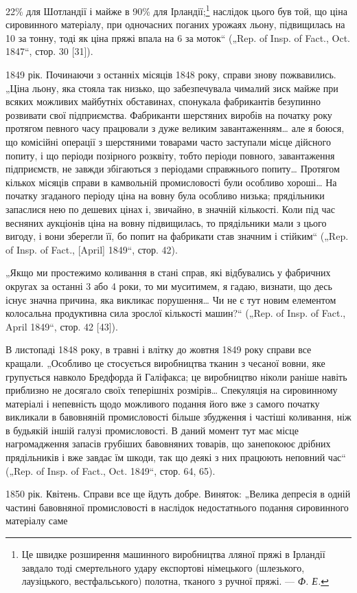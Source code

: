 \parcont{}  %
22\% для Шотландії і майже в 90\% для Ірландії;\footnote{
Це швидке розширення машинного виробництва лляної пряжі в Ірландії
завдало тоді смертельного удару експортові німецького (шлезького, лаузіцького,
вестфальського) полотна, тканого з ручної пряжі. — \emph{Ф. Е.}
} наслідок цього
був той, що ціна сировинного матеріалу, при одночасних поганих
урожаях льону, підвищилась на 10 за
тонну, тоді як ціна пряжі впала на 6 за моток“ („Rep.
of Insp. of Fact., Oct. 1847“, стор. 30 [31]).

1849 рік. Починаючи з останніх місяців 1848 року, справи
знову пожвавились. „Ціна льону, яка стояла так низько, що забезпечувала
чималий зиск майже при всяких можливих майбутніх
обставинах, спонукала фабрикантів безупинно розвивати свої
підприємства. Фабриканти шерстяних виробів на початку року
протягом певного часу працювали з дуже великим завантаженням\dots{}
але я боюся, що комісійні операції з шерстяними товарами
часто заступали місце дійсного попиту, і що періоди позірного
розквіту, тобто періоди повного, завантаження підприємств, не
завжди збігаються з періодами справжнього попиту\dots{} Протягом
кількох місяців справи в камвольній промисловості були особливо
хороші\dots{} На початку згаданого періоду ціна на вовну була особливо
низька; прядільники запаслися нею по дешевих цінах
і, звичайно, в значній кількості. Коли під час весняних аукціонів
ціна на вовну підвищилась, то прядільники мали з цього вигоду,
і вони зберегли її, бо попит на фабрикати став значним і стійким“
(„Rep. of Insp. of Fact., [April] 1849“, стор. 42).

„Якщо ми простежимо коливання в стані справ, які відбувались
у фабричних округах за останні 3 або 4 роки, то ми муситимем,
я гадаю, визнати, що десь існує значна причина, яка
викликає порушення\dots{} Чи не є тут новим елементом колосальна
продуктивна сила зрослої кількості машин?“ („Rep. of Insp.
of Fact., April 1849“, стор. 42 [43]).

В листопаді 1848 року, в травні і влітку до жовтня 1849 року
справи все кращали. „Особливо це стосується виробництва
тканин з чесаної вовни, яке групується навколо Бредфорда
й Галіфакса; це виробництво ніколи раніше навіть приблизно
не досягало своїх теперішніх розмірів\dots{} Спекуляція на сировинному
матеріалі і непевність щодо можливого подання його
вже з самого початку викликали в бавовняній промисловості
більше збудження і частіші коливання, ніж в будьякій іншій
галузі промисловості. В даний момент тут має місце нагромадження
запасів грубіших бавовняних товарів, що занепокоює
дрібних прядільників і вже завдає їм шкоди, так що деякі з
них працюють неповний час“ („Rep. of Insp. of Fact., Oct. 1849“,
стор. 64, 65).

1850 рік. Квітень. Справи все ще йдуть добре. Виняток:
„Велика депресія в одній частині бавовняної промисловості
в наслідок недостатнього подання сировинного матеріалу саме
\parbreak{}  %
